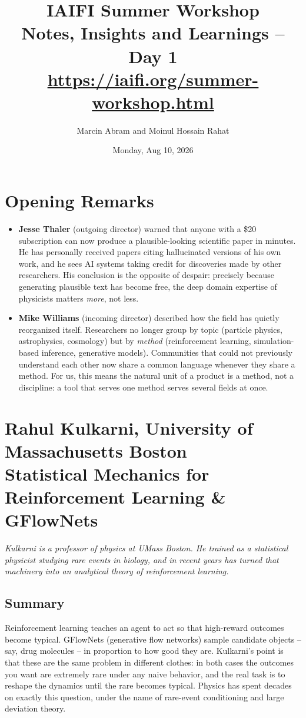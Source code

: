 \documentclass[11pt]{article}
\title{IAIFI Summer Workshop\\[12pt]
\large{Notes, Insights and Learnings -- Day 1}\\[3pt]
\large{\url{https://iaifi.org/summer-workshop.html}}}
\author{Marcin Abram and Moinul Hossain Rahat}
\date{Monday, Aug 10, 2026}
\begin{document}
\maketitle

\section*{Opening Remarks}

\begin{itemize}
    \item \textbf{Jesse Thaler} (outgoing director) warned that anyone with a \$20 subscription can now produce a plausible-looking scientific paper in minutes. He has personally received papers citing hallucinated versions of his own work, and he sees AI systems taking credit for discoveries made by other researchers. His conclusion is the opposite of despair: precisely because generating plausible text has become free, the deep domain expertise of physicists matters \emph{more}, not less.
    \item \textbf{Mike Williams} (incoming director) described how the field has quietly reorganized itself. Researchers no longer group by topic (particle physics, astrophysics, cosmology) but by \emph{method} (reinforcement learning, simulation-based inference, generative models). Communities that could not previously understand each other now share a common language whenever they share a method. For us, this means the natural unit of a product is a method, not a discipline: a tool that serves one method serves several fields at once.
\end{itemize}

\section{Rahul Kulkarni, University of Massachusetts Boston\\ {\large Statistical Mechanics for Reinforcement Learning \& GFlowNets}}

\emph{Kulkarni is a professor of physics at UMass Boston. He trained as a statistical physicist studying rare events in biology, and in recent years has turned that machinery into an analytical theory of reinforcement learning.}

\subsection*{Summary}
Reinforcement learning teaches an agent to act so that high-reward outcomes become typical. GFlowNets (generative flow networks) sample candidate objects -- say, drug molecules -- in proportion to how good they are. Kulkarni's point is that these are the same problem in different clothes: in both cases the outcomes you want are extremely rare under any naive behavior, and the real task is to reshape the dynamics until the rare becomes typical. Physics has spent decades on exactly this question, under the name of rare-event conditioning and large deviation theory.
\end{document}
